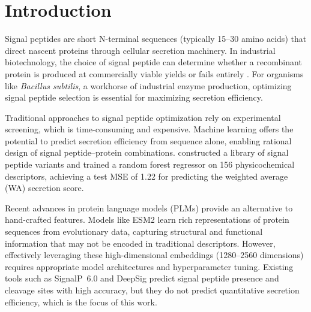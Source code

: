 \documentclass[12pt]{article}
\begin{document}
\section{Introduction}
\label{sec:intro}

Signal peptides are short N-terminal sequences (typically 15--30 amino acids) that direct nascent proteins through cellular secretion machinery.
In industrial biotechnology, the choice of signal peptide can determine whether a recombinant protein is produced at commercially viable yields or fails entirely \citep{grasso2023}.
For organisms like \textit{Bacillus subtilis}, a workhorse of industrial enzyme production, optimizing signal peptide selection is essential for maximizing secretion efficiency.

Traditional approaches to signal peptide optimization rely on experimental screening, which is time-consuming and expensive.
Machine learning offers the potential to predict secretion efficiency from sequence alone, enabling rational design of signal peptide--protein combinations.
\citet{grasso2023} constructed a library of signal peptide variants and trained a random forest regressor on 156 physicochemical descriptors, achieving a test MSE of 1.22 for predicting the weighted average (WA) secretion score.

Recent advances in protein language models (PLMs) provide an alternative to hand-crafted features.
Models like ESM2 \citep{lin2023} learn rich representations of protein sequences from evolutionary data, capturing structural and functional information that may not be encoded in traditional descriptors.
However, effectively leveraging these high-dimensional embeddings (1280--2560 dimensions) requires appropriate model architectures and hyperparameter tuning.
Existing tools such as SignalP~6.0 \citep{teufel2022} and DeepSig \citep{savojardo2018} predict signal peptide presence and cleavage sites with high accuracy, but they do not predict quantitative secretion efficiency, which is the focus of this work.
\end{document}
